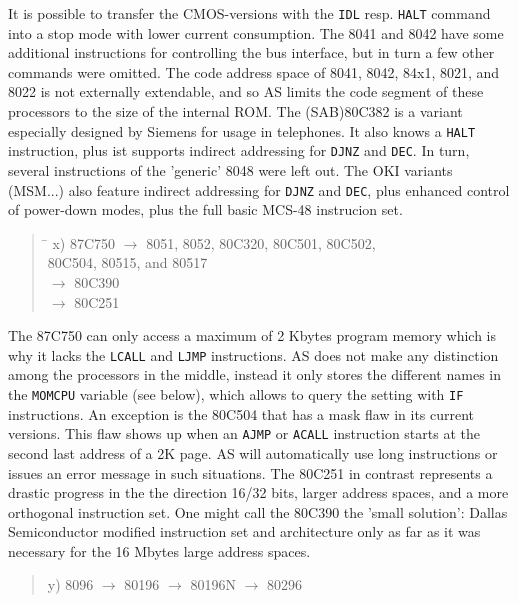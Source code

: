 \documentclass[12pt,twoside]{report}
\newcommand{\tty}[1]{{\tt #1}}
\begin{document}
It is possible to transfer the CMOS-versions with the \tty{IDL} resp.
\tty{HALT} command into a stop mode with lower current consumption.
The 8041 and 8042 have some additional instructions for controlling the
bus interface, but in turn a few other commands were omitted.
The code address space of 8041, 8042, 84x1, 8021, and 8022 is not externally
extendable, and so AS limits the code segment of these processors to
the size of the internal ROM.  The (SAB)80C382 is a variant especially
designed by Siemens for usage in telephones.  It also knows a
\tty{HALT} instruction, plus ist supports indirect addressing for
\tty{DJNZ} and \tty{DEC}.  In turn, several instructions of the
'generic' 8048 were left out.  The OKI variants (MSM...) also
feature indirect addressing for \tty{DJNZ} and \tty{DEC}, plus
enhanced control of power-down modes, plus the full basic MCS-48
instrucion set.
\begin{quote}
\begin{tabbing}
\hspace{0.7cm} \= \kill
x) \> 87C750 $\rightarrow$ 8051, 8052, 80C320, 80C501, 80C502, \\
   \> 80C504, 80515, and 80517 \\
   \> $\rightarrow$ 80C390 \\
   \> $\rightarrow$ 80C251
\end{tabbing}
\end{quote}
The 87C750 can only access a maximum of 2 Kbytes program memory which is
why it lacks the \tty{LCALL} and \tty{LJMP} instructions.  AS does not
make any distinction among the processors in the middle, instead it only
stores the different names in the \tty{MOMCPU} variable (see below), which
allows to query the setting with \tty{IF} instructions.  An exception is
the 80C504 that has a mask flaw in its current versions.  This flaw shows
up when an \tty{AJMP} or \tty{ACALL} instruction starts at the second last
address of a 2K page.  AS will automatically use long instructions or
issues an error message in such situations.  The 80C251 in contrast
represents a drastic progress in the the direction 16/32 bits, larger
address spaces, and a more orthogonal instruction set.  One might call the
80C390 the 'small solution': Dallas Semiconductor modified instruction set
and architecture only as far as it was necessary for the 16 Mbytes large
address spaces.
\begin{quote}
y) 8096 $\rightarrow$ 80196 $\rightarrow$ 80196N $\rightarrow$ 80296
\end{quote}
\end{document}
